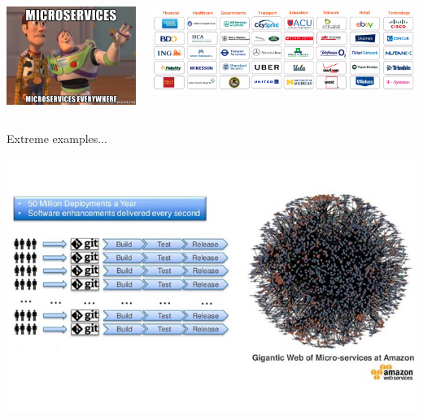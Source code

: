 \begin{frame}
    \begin{columns}
        \begin{column}{0.4\textwidth}
            \begin{center}
                \includegraphics[width=.9\textwidth]{./assets/microservice_love}
            \end{center}
        \end{column}
        \begin{column}{0.6\textwidth}
            \begin{center}
                \includegraphics[width=1\textwidth]{./assets/microservices_companies}
            \end{center}
        \end{column}
    \end{columns}
\end{frame}

\begin{frame}{Extreme examples...}
    \begin{center}
        \includegraphics[width=.8\textwidth]{./assets/aws_microservices}
    \end{center}
\end{frame}


